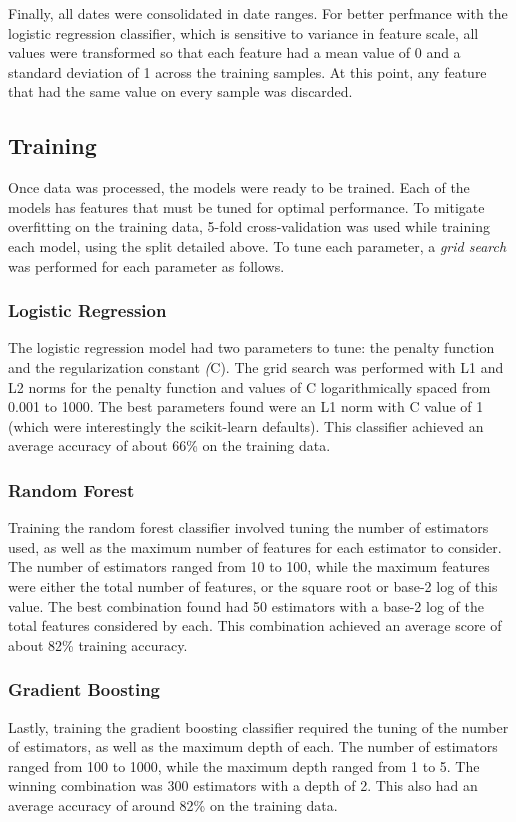 Finally, all dates were consolidated in date ranges. For better perfmance with the logistic regression classifier, which 
is sensitive to variance in feature scale, all values were transformed so that each feature had a mean value of 0 and a 
standard deviation of 1 across the training samples. At this point, any feature that had the same value on every sample 
was discarded.

\subsection{Training}
\label{methods.training}

Once data was processed, the models were ready to be trained. Each of the models has features that must be tuned for optimal 
performance. To mitigate overfitting on the training data, 5-fold cross-validation was used while training each model, using 
the split detailed above. To tune each parameter, a \emph{grid search} was performed for each parameter as follows.

\subsubsection{Logistic Regression}
\label{methods.training.lr}
The logistic regression model had two parameters to tune: the penalty function and the regularization constant \emph(C). The grid 
search was performed with L1 and L2 norms for the penalty function and values of C logarithmically spaced from 0.001 to 1000. The 
best parameters found were an L1 norm with C value of 1 (which were interestingly the scikit-learn defaults). This 
classifier achieved an average accuracy of about 66\% on the training data.

\subsubsection{Random Forest}
\label{methods.training.rf}
Training the random forest classifier involved tuning the number of estimators used, as well as the maximum number of features 
for each estimator to consider. The number of estimators ranged from 10 to 100, while the maximum features were either the 
total number of features, or the square root or base-2 log of this value. The best combination found had 50 estimators with 
a base-2 log of the total features considered by each. This combination achieved an average score of about 82\% training accuracy.


\subsubsection{Gradient Boosting}
\label{methods.training.gb}
Lastly, training the gradient boosting classifier required the tuning of the number of estimators, as well as 
the maximum depth of each. The number of estimators ranged from 100 to 1000, while the maximum depth ranged from 1 to 5. 
The winning combination was 300 estimators with a depth of 2. This also had an average accuracy of around 82\%
on the training data.
